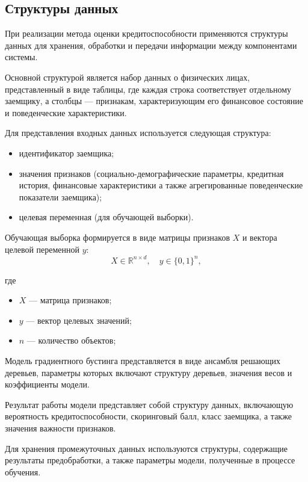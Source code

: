 \subsection{Структуры данных}

При реализации метода оценки кредитоспособности применяются структуры данных для хранения, обработки и передачи информации между компонентами системы.

Основной структурой является набор данных о физических лицах, представленный в виде таблицы, где каждая строка соответствует отдельному заемщику, а столбцы — признакам, характеризующим его финансовое состояние и поведенческие характеристики.

Для представления входных данных используется следующая структура:
\begin{itemize}
  \item идентификатор заемщика;
  \item значения признаков (социально-демографические параметры, кредитная история, финансовые характеристики а также агрегированные поведенческие показатели заемщика);
  \item целевая переменная (для обучающей выборки).
\end{itemize}

Обучающая выборка формируется в виде матрицы признаков $X$ и вектора целевой переменной $y$:
\begin{equation}
  X \in \mathbb{R}^{n \times d}, \quad y \in \{0, 1\}^{n},
\end{equation}

где

\begin{itemize}
  \item $X$ --- матрица признаков;
  \item $y$ --- вектор целевых значений;
  \item $n$ --- количество объектов;
\end{itemize}

Модель градиентного бустинга представляется в виде ансамбля решающих деревьев, параметры которых включают структуру деревьев, значения весов и коэффициенты модели.

Результат работы модели представляет собой структуру данных, включающую вероятность кредитоспособности, скоринговый балл, класс заемщика, а также значения важности признаков.

Для хранения промежуточных данных используются структуры, содержащие результаты предобработки, а также параметры модели, полученные в процессе обучения.

